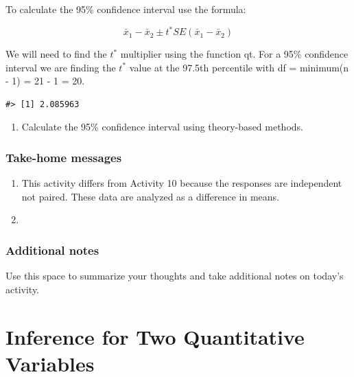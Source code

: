 \documentclass[
]{report}
\providecommand{\tightlist}{%
  \setlength{\itemsep}{0pt}\setlength{\parskip}{0pt}}
\begin{document}
\vspace{0.5in}

To calculate the 95\% confidence interval use the formula:

\[\bar{x}_1- \bar{x}_2\pm t^* SE(\bar{x}_1- \bar{x}_2)\]

We will need to find the \(t^*\) multiplier using the function qt. For a 95\% confidence interval we are finding the \(t^*\) value at the 97.5th percentile with df = minimum(n - 1) = 21 - 1 = 20.

\begin{verbatim}
#> [1] 2.085963
\end{verbatim}

\begin{enumerate}
\def\labelenumi{\arabic{enumi}.}
\setcounter{enumi}{6}
\tightlist
\item
  Calculate the 95\% confidence interval using theory-based methods.
\end{enumerate}

\vspace{1in}

\hypertarget{take-home-messages-10}{%
\subsection{Take-home messages}\label{take-home-messages-10}}

\begin{enumerate}
\def\labelenumi{\arabic{enumi}.}
\item
  This activity differs from Activity 10 because the responses are independent not paired. These data are analyzed as a difference in means.
\item
\end{enumerate}

\hypertarget{additional-notes-10}{%
\subsection{Additional notes}\label{additional-notes-10}}

Use this space to summarize your thoughts and take additional notes on today's activity.

\hypertarget{inference-for-two-quantitative-variables}{%
\chapter{Inference for Two Quantitative Variables}\label{inference-for-two-quantitative-variables}}
\end{document}
